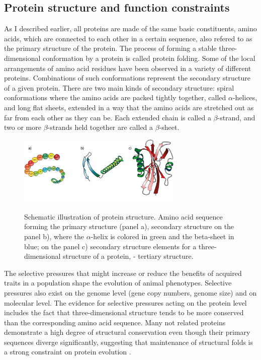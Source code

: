 \documentclass[11pt, a4paper,oneside]{report}
\begin{document}
\subsection{Protein structure and function constraints}
As I described earlier,  all proteins are made of the
same basic constituents, amino acids, which are connected to each other in a certain sequence, also refered to as the primary structure of the protein. The process of forming a stable three-dimensional conformation by a protein is called protein folding. 
 Some of the local arrangements of amino acid residues have been observed in a variety of different proteins.  Combinations of such conformations represent the secondary structure of a given protein.  There are two main kinds of secondary structure: spiral conformations where the amino acids are packed tightly together, called $\alpha$-helices, and long flat sheets, extended in a way that the amino acids are stretched out as far from each other as they can be. Each extended chain is called a $\beta$-strand, and two or more $\beta$-strands held together are called a $\beta$-sheet.

\begin{figure}[t]
\begin{center}
\label{img:populations}
\includegraphics[width=0.7\textwidth]{figures/protein_structure.png}
\end{center}
\caption{Schematic illustration of protein structure. Amino acid sequence forming the primary structure (panel a), secondary structure on the panel b), where the $\alpha$-helix is colored in green and the beta-sheet in blue; on the panel c) secondary structure elements for a three-dimensional structure of a protein, - tertiary structure.} 
\end{figure}

The selective pressures that might increase or reduce the benefits of acquired traits in a population shape the evolution of animal phenotypes. Selective pressures also exist on the genome level (gene copy numbers, genome size) and on molecular level. The evidence for selective pressures acting on the protein level includes the fact that three-dimensional structure tends to be more conserved than the corresponding amino acid sequence\cite{Illergard2009}.  Many not related proteins demonstrate a high degree of structural conservation even though their primary sequences diverge significantly, suggesting that maintenance of structural folds is a strong constraint on protein evolution \cite{Sousounis2012}. 
\end{document}
